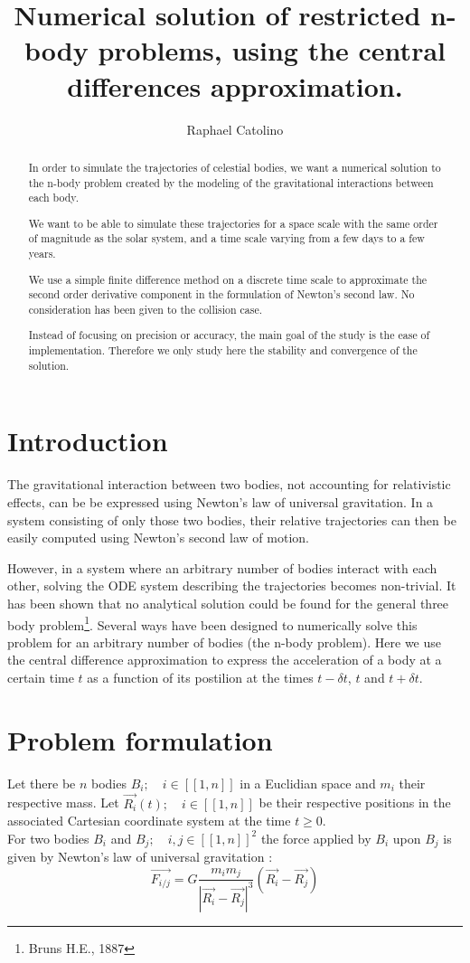 \documentclass[a4paper,11pt]{article}
\author{Raphael Catolino}
\title{Numerical solution of restricted n-body problems, using
the central differences approximation.}
\begin{document}
\maketitle

\begin{abstract}
  In order to simulate the trajectories of celestial bodies,
  we want a numerical solution to the n-body problem created
  by the modeling of the gravitational interactions between each body.

  We want to be able to simulate these trajectories for a space scale
  with the same order of magnitude as the solar system, and a time scale
  varying from a few days to a few years.

  We use a simple finite difference method on a discrete time scale
  to approximate the second order derivative component in the formulation
  of Newton's second law. No consideration has been given to the collision case.

  Instead of focusing on precision or accuracy, the main goal of the
  study is the ease of implementation. Therefore we only study here the
  stability and convergence of the solution.
\end{abstract}
\newpage
\tableofcontents
\newpage

\section{Introduction}
The gravitational interaction between two bodies, not accounting for relativistic
effects, can be be expressed using Newton's law of universal gravitation.
In a system consisting of only those two bodies, their relative trajectories
can then be easily computed using Newton's second law of motion.

However, in a system where an arbitrary number of bodies
interact with each other, solving the ODE system describing the
trajectories becomes non-trivial. It has been shown that no analytical solution
could be found for the general three body problem\footnote{Bruns H.E., 1887}.
Several ways have been designed to numerically solve this problem for an
arbitrary number of bodies (the n-body problem). Here we use the central difference
approximation to express the acceleration of a body at a certain time $t$ as a
function of its postilion at the times $t-\delta t$, $t$ and $t+\delta t$.

\section{Problem formulation}
Let there be $n$ bodies $B_i;\quad i \in [[1, n]]$ in a Euclidian space and $m_i$
their respective mass.
Let $\vec{R_i}(t);\quad i \in [[1,n]]$ be their respective positions in the associated Cartesian
coordinate system at the time $t \ge 0$.\\
For two bodies $B_i$ and $B_j;\quad i,j \in [[1, n]]^2$ the force applied by $B_i$ upon
$B_j$ is given by Newton's law of universal gravitation :
\begin{equation}
  \vec{F_{i/j}} = G \frac{m_i m_j}{|{\vec{R_i} - \vec{R_j}}|^3} (\vec{R_i} - \vec{R_j})
\end{equation}
\end{document}
